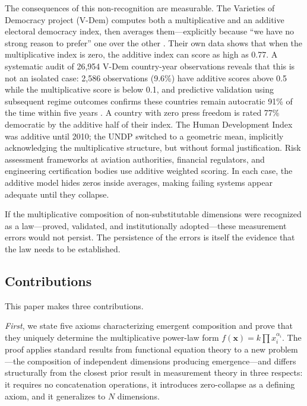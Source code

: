 \documentclass[12pt, a4paper]{article}
\theoremstyle{definition}
\theoremstyle{remark}
\begin{document}
The consequences of this non-recognition are measurable. The Varieties of Democracy project (V-Dem) computes both a multiplicative and an additive electoral democracy index, then averages them---explicitly because ``we have no strong reason to prefer'' one over the other \cite{coppedge2018}. Their own data shows that when the multiplicative index is zero, the additive index can score as high as 0.77. A systematic audit of 26,954 V-Dem country-year observations reveals that this is not an isolated case: 2,586 observations (9.6\%) have additive scores above 0.5 while the multiplicative score is below 0.1, and predictive validation using subsequent regime outcomes confirms these countries remain autocratic 91\% of the time within five years \cite{kirsch2026audit}. A country with zero press freedom is rated 77\% democratic by the additive half of their index. The Human Development Index was additive until 2010; the UNDP switched to a geometric mean, implicitly acknowledging the multiplicative structure, but without formal justification. Risk assessment frameworks at aviation authorities, financial regulators, and engineering certification bodies use additive weighted scoring. In each case, the additive model hides zeros inside averages, making failing systems appear adequate until they collapse.

If the multiplicative composition of non-substitutable dimensions were recognized as a law---proved, validated, and institutionally adopted---these measurement errors would not persist. The persistence of the errors is itself the evidence that the law needs to be established.

\subsection{Contributions}

This paper makes three contributions.

\textit{First}, we state five axioms characterizing emergent composition and prove that they uniquely determine the multiplicative power-law form $f(\mathbf{x}) = k \prod x_i^{\alpha_i}$. The proof applies standard results from functional equation theory \cite{aczel1966} to a new problem---the composition of independent dimensions producing emergence---and differs structurally from the closest prior result in measurement theory \cite{luce1965} in three respects: it requires no concatenation operations, it introduces zero-collapse as a defining axiom, and it generalizes to $N$ dimensions.
\end{document}
